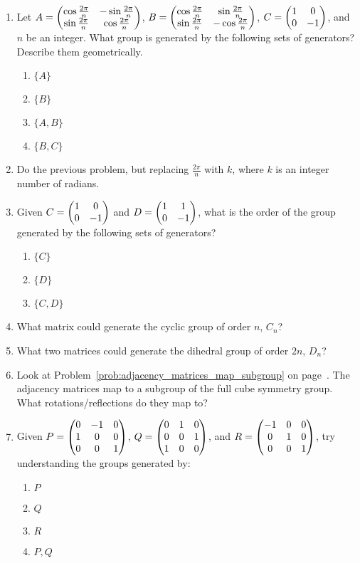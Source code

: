 \documentclass[../gatm_answers.tex]{subfiles}
\begin{document}
\begin{enumerate}
\item Let $A=\begin{pmatrix} \cos\frac{2\pi}{n} & -\sin\frac{2\pi}{n} \\ \sin\frac{2\pi}{n} & \cos\frac{2\pi}{n} \end{pmatrix}$, $B=\begin{pmatrix} \cos\frac{2\pi}{n} & \sin\frac{2\pi}{n} \\ \sin\frac{2\pi}{n} & -\cos\frac{2\pi}{n} \end{pmatrix}$, $C=\begin{pmatrix} 1 & 0 \\ 0 & -1 \end{pmatrix}$, and $n$ be an integer. What group is generated by the following sets of generators? Describe them geometrically. \begin{multicols}{4}%
\begin{enumerate}%
\item $\{A\}$
\item $\{B\}$
\item $\{A,B\}$
\item $\{B,C\}$
\end{enumerate}%
\end{multicols}%
\item Do the previous problem, but replacing $\frac{2\pi}{n}$ with $k$, where $k$ is an integer number of radians.
\item Given $C=\begin{pmatrix} 1 & 0 \\ 0 & -1 \end{pmatrix}$ and $D=\begin{pmatrix} 1 & 1 \\ 0 & -1 \end{pmatrix}$, what is the order of the group generated by the following sets of generators?
\begin{multicols}{3}
\begin{enumerate}
\item $\{C\}$
\item $\{D\}$
\item $\{C,D\}$
\end{enumerate}
\end{multicols}
\item What matrix could generate the cyclic group of order $n$, $C_n$?
\item What two matrices could generate the dihedral group of order $2n$, $D_n$?
\item Look at Problem~\ref{prob:adjacency_matrices_map_subgroup} on page~\pageref{prob:adjacency_matrices_map_subgroup}. The adjacency matrices map to a subgroup of the full cube symmetry group. What rotations/reflections do they map to?
\item Given $P=\begin{pmatrix} 0 & -1 & 0 \\ 1 & 0 & 0 \\ 0 & 0 & 1 \end{pmatrix}$, $Q=\begin{pmatrix} 0 & 1 & 0 \\ 0 & 0 & 1 \\ 1 & 0 & 0 \end{pmatrix}$, and $R=\begin{pmatrix} -1 & 0 & 0 \\ 0 & 1 & 0 \\ 0 & 0 & 1 \end{pmatrix}$, try understanding the groups generated by:
\begin{multicols}{4}
\begin{enumerate}
\item ${P}$
\item ${Q}$
\item ${R}$
\item ${P,Q}$

\end{enumerate}
\end{multicols}
\end{enumerate}
\end{document}
